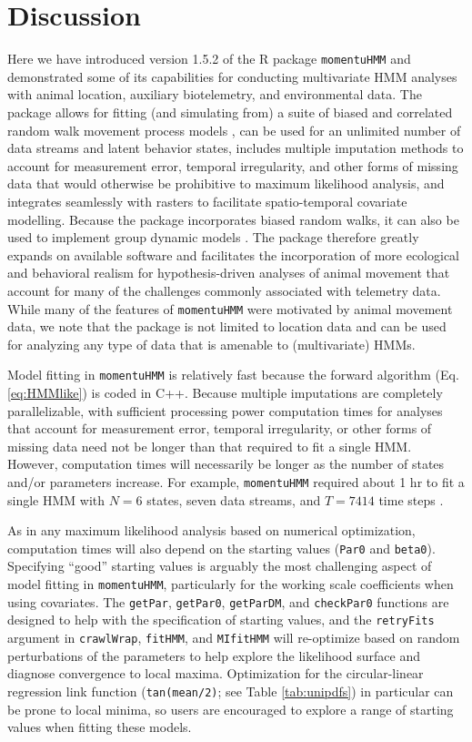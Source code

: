 \documentclass[12pt]{article}\usepackage[]{graphicx}\usepackage[]{color}
\begin{document}
\section{Discussion}
Here we have introduced version 1.5.2 of the R package \verb|momentuHMM| and demonstrated some of its capabilities for conducting multivariate HMM analyses with animal location, auxiliary biotelemetry, and environmental data. The package allows for fitting (and simulating from) a suite of biased and correlated random walk movement process models \citep[e.g.][]{McClintockEtAl2012}, can be used for an unlimited number of data streams and latent behavior states, includes multiple imputation methods to account for measurement error, temporal irregularity, and other forms of missing data that would otherwise be prohibitive to maximum likelihood analysis, and integrates seamlessly with rasters to facilitate spatio-temporal covariate modelling. Because the package incorporates biased random walks, it can also be used to implement group dynamic models \cite[e.g.][]{LangrockEtAl2014}. The package therefore greatly expands on available software and facilitates the incorporation of more ecological and behavioral realism for hypothesis-driven analyses of animal movement that account for many of the challenges commonly associated with telemetry data. While many of the features of \verb|momentuHMM| were motivated by animal movement data, we note that the package is not limited to location data and can be used for analyzing any type of data that is amenable to (multivariate) HMMs.

Model fitting in \verb|momentuHMM| is relatively fast because the forward algorithm (Eq. \ref{eq:HMMlike}) is coded in C++. Because multiple imputations are completely parallelizable, with sufficient processing power computation times for analyses that account for measurement error, temporal irregularity, or other forms of missing data need not be longer than that required to fit a single HMM.  However, computation times will necessarily be longer as the number of states and/or parameters increase. For example, \verb|momentuHMM| required about 1 hr to fit a single HMM with $N=6$ states, seven data streams, and $T=7414$ time steps \citep{McClintock2017}. 

As in any maximum likelihood analysis based on numerical optimization, computation times will also depend on the starting values (\verb|Par0| and \verb|beta0|). Specifying ``good'' starting values is arguably the most challenging aspect of model fitting in \verb|momentuHMM|, particularly for the working scale coefficients when using covariates. The \verb|getPar|, \verb|getPar0|, \verb|getParDM|, and \verb|checkPar0| functions are designed to help with the specification of starting values, and the \verb|retryFits| argument in \verb|crawlWrap|, \verb|fitHMM|, and \verb|MIfitHMM| will re-optimize based on random perturbations of the parameters to help explore the likelihood surface and diagnose convergence to local maxima. Optimization for the circular-linear regression link function (\verb|tan(mean/2)|; see Table \ref{tab:unipdfs}) in particular can be prone to local minima, so users are encouraged to explore a range of starting values when fitting these models.
\end{document}
